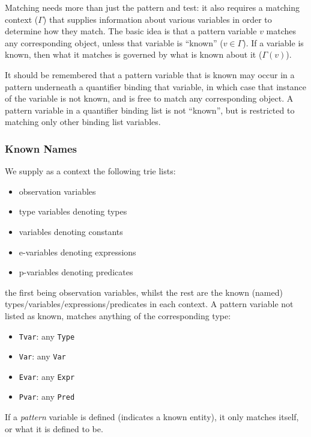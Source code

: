 Matching needs more than just the pattern and test:
it also requires a matching context ($\Gamma$)
that supplies information about various variables in order to
determine how they match.
The basic idea is that a pattern variable $v$ matches any corresponding
object, unless that variable is ``known'' ($v \in \Gamma$).
If a variable is known, then what it matches is governed
by what is known about it ($\Gamma(v)$).

It should be remembered that a pattern variable that is known
may occur in a pattern underneath a quantifier binding that variable,
in which case that instance of the variable is not known,
and is free to match any corresponding object.
A pattern variable in a quantifier binding list 
is not ``known'', but is restricted to matching only other
binding list variables.

\subsubsection{Known Names}

We supply as a context the following trie lists:
\begin{itemize}
  \item observation variables
  \item type variables denoting types
  \item variables denoting constants
  \item e-variables denoting expressions
  \item p-variables denoting predicates
\end{itemize}
the first being observation variables,
whilst the rest are the known (named) 
types/variables/expressions/predicates in each context.
A pattern variable not listed as known, matches anything of the corresponding type:
\begin{itemize}
  \item \texttt{Tvar}: any \texttt{Type}
  \item \texttt{Var}: any \texttt{Var}
  \item \texttt{Evar}: any \texttt{Expr}
  \item \texttt{Pvar}: any \texttt{Pred}
\end{itemize}
If a \emph{pattern} variable is defined (indicates a known entity),
it only matches itself, or what it is defined to be.
